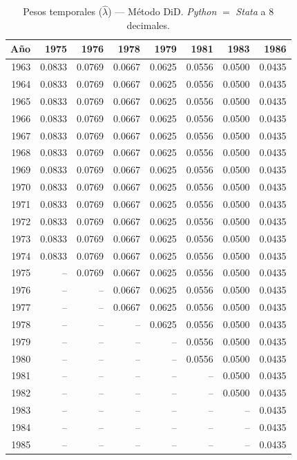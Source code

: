 \begin{table}[H]
\centering
\caption{Pesos temporales ($\hat{\lambda}$) --- M\'etodo DiD. \textit{Python} $=$ \textit{Stata} a 8 decimales.}
\label{tab:lambda_did}
\small
\begin{tabular}{rrrrrrrr}
\toprule
A\~{n}o & 1975 & 1976 & 1978 & 1979 & 1981 & 1983 & 1986 \\
\midrule
1963 & 0.0833 & 0.0769 & 0.0667 & 0.0625 & 0.0556 & 0.0500 & 0.0435 \\
1964 & 0.0833 & 0.0769 & 0.0667 & 0.0625 & 0.0556 & 0.0500 & 0.0435 \\
1965 & 0.0833 & 0.0769 & 0.0667 & 0.0625 & 0.0556 & 0.0500 & 0.0435 \\
1966 & 0.0833 & 0.0769 & 0.0667 & 0.0625 & 0.0556 & 0.0500 & 0.0435 \\
1967 & 0.0833 & 0.0769 & 0.0667 & 0.0625 & 0.0556 & 0.0500 & 0.0435 \\
1968 & 0.0833 & 0.0769 & 0.0667 & 0.0625 & 0.0556 & 0.0500 & 0.0435 \\
1969 & 0.0833 & 0.0769 & 0.0667 & 0.0625 & 0.0556 & 0.0500 & 0.0435 \\
1970 & 0.0833 & 0.0769 & 0.0667 & 0.0625 & 0.0556 & 0.0500 & 0.0435 \\
1971 & 0.0833 & 0.0769 & 0.0667 & 0.0625 & 0.0556 & 0.0500 & 0.0435 \\
1972 & 0.0833 & 0.0769 & 0.0667 & 0.0625 & 0.0556 & 0.0500 & 0.0435 \\
1973 & 0.0833 & 0.0769 & 0.0667 & 0.0625 & 0.0556 & 0.0500 & 0.0435 \\
1974 & 0.0833 & 0.0769 & 0.0667 & 0.0625 & 0.0556 & 0.0500 & 0.0435 \\
1975 & -- & 0.0769 & 0.0667 & 0.0625 & 0.0556 & 0.0500 & 0.0435 \\
1976 & -- & -- & 0.0667 & 0.0625 & 0.0556 & 0.0500 & 0.0435 \\
1977 & -- & -- & 0.0667 & 0.0625 & 0.0556 & 0.0500 & 0.0435 \\
1978 & -- & -- & -- & 0.0625 & 0.0556 & 0.0500 & 0.0435 \\
1979 & -- & -- & -- & -- & 0.0556 & 0.0500 & 0.0435 \\
1980 & -- & -- & -- & -- & 0.0556 & 0.0500 & 0.0435 \\
1981 & -- & -- & -- & -- & -- & 0.0500 & 0.0435 \\
1982 & -- & -- & -- & -- & -- & 0.0500 & 0.0435 \\
1983 & -- & -- & -- & -- & -- & -- & 0.0435 \\
1984 & -- & -- & -- & -- & -- & -- & 0.0435 \\
1985 & -- & -- & -- & -- & -- & -- & 0.0435 \\
\bottomrule
\end{tabular}
\end{table}

